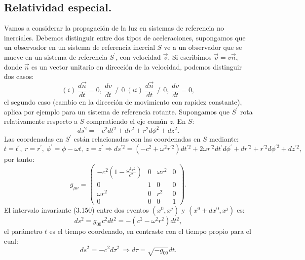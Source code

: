 \subsection{Relatividad especial.}
Vamos a considerar la propagación de la luz en sistemas de referencia no inerciales. Debemos distinguir entre dos tipos de aceleraciones, supongamos que un observador en un sistema de referencia inercial $S$ ve a un observador que se mueve en un sistema de referencia $S^{'}$, con velocidad $\vec{v}$. Si escribimos $\vec{v}=v\vec{n}$, donde $\vec{n}$ es un vector unitario en dirección de la velocidad, podemos distinguir dos casos:
\begin{equation}
(i)\ \frac{d\vec{n}}{dt}=0,\ \frac{dv}{dt}\neq0\ (ii)\ \frac{d\vec{n}}{dt}\neq0,\ \frac{dv}{dt}=0,
\end{equation}
el segundo caso (cambio en la dirección de movimiento con rapidez constante), aplica por ejemplo para un sistema de referencia rotante. Supongamos que $S^{'}$ rota relativamente respecto a $S$ compratiendo el eje común $z$. En $S$:
\begin{equation}
ds^{2}=-c^{2}dt^{2}+dr^{2}+r^{2}d\phi^{2}+dz^{2}.
\end{equation}
Las coordenadas en $S^{'}$ están relacionadas con las coordenadas en $S$ mediante:
\begin{equation}
t=t^{'},\ r=r^{'},\ \phi^{'}=\phi-\omega t,\ z=z^{'}\Rightarrow ds^{'2}=(-c^{2}+\omega^{2}r^{'2})dt^{'2}+2\omega r^{'2}dt^{'}d\phi^{'}+dr^{'2}+r^{'2}d\phi^{'2}+dz^{'2},
\end{equation}
por tanto:
\begin{equation}
g_{\mu\nu}=\left(\begin{array}{cccc}
-c^2\left(1-\frac{\omega^{2}r^{2}}{c^{2}}\right) & 0 & \omega r^{2} & 0\\
0 & 1 & 0 & 0\\
\omega r^{2} & 0 & r^{2} & 0\\
0 & 0 & 0 & 1
\end{array}\right) .
\end{equation}
El intervalo invariante (3.150) entre dos eventos $(x^0,x^j)$ y $(x^0+dx^0,x^j)$ es:
\begin{equation}
ds^2=g_{00}c^2dt^2=-(c^2-\omega^2r^2)dt^2,
\end{equation} 
el parámetro $t$ es el tiempo coordenado, en contraste con el tiempo propio para el cual:
\begin{equation}
ds^2=-c^2d\tau^2 \ \Rightarrow d\tau=\sqrt{-g_{00}}dt. 
\end{equation}
